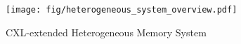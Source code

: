 \begin{figure}[t]
  \centering
  \texttt{[image: fig/heterogeneous\_system\_overview.pdf]}
  \vspace{-0.45cm}
  \caption{CXL-extended Heterogeneous Memory System}
  \vspace{-0.66cm}
  \label{fig:heterogeneous_system_overview}
\end{figure}